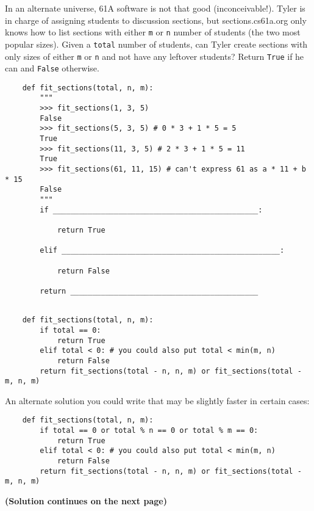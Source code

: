 \begin{blocksection}
    \question In an alternate universe, 61A software is not that good (inconceivable!). 
    Tyler is in charge of assigning students to discussion sections, but sections.cs61a.org 
    only knows how to list sections with either \lstinline{m} or \lstinline{n} number of students (the two most popular sizes). 
    Given a \lstinline{total} number of students, can Tyler create sections with only sizes of either \lstinline{m} or \lstinline{n} and not have any leftover students? 
    Return \lstinline{True} if he can and \lstinline{False} otherwise.
    
    \begin{lstlisting}
    def fit_sections(total, n, m):
        """
        >>> fit_sections(1, 3, 5)
        False
        >>> fit_sections(5, 3, 5) # 0 * 3 + 1 * 5 = 5
        True
        >>> fit_sections(11, 3, 5) # 2 * 3 + 1 * 5 = 11
        True
        >>> fit_sections(61, 11, 15) # can't express 61 as a * 11 + b * 15
        False
        """
        if _______________________________________________:
    
            return True
    
        elif __________________________________________________:
    
            return False
    
        return ___________________________________________
    
    \end{lstlisting}
    \end{blocksection}
    
    \begin{solution}[1.5in]
    \begin{blocksection}
    \begin{lstlisting}
    def fit_sections(total, n, m):
        if total == 0:
            return True
        elif total < 0: # you could also put total < min(m, n)
            return False
        return fit_sections(total - n, n, m) or fit_sections(total - m, n, m)
    \end{lstlisting}
    An alternate solution you could write that may be slightly faster in certain cases:
    \begin{lstlisting}
    def fit_sections(total, n, m):
        if total == 0 or total % n == 0 or total % m == 0:
            return True
        elif total < 0: # you could also put total < min(m, n)
            return False
        return fit_sections(total - n, n, m) or fit_sections(total - m, n, m)
    \end{lstlisting}
    
    \textbf{(Solution continues on the next page)}
    \end{blocksection}
    \end{solution}
    
